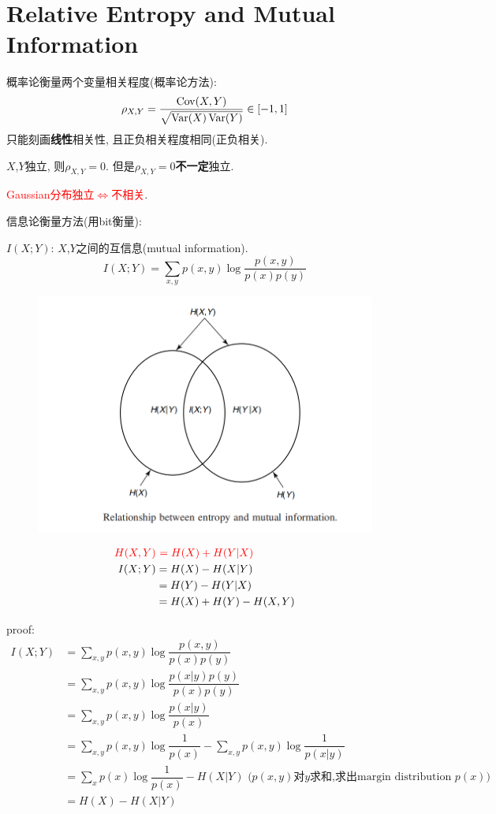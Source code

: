 \section{Relative Entropy and Mutual Information}
概率论衡量两个变量相关程度(概率论方法):
$$\rho_{X,Y}=\dfrac{\operatorname{Cov}(X,Y)}{\sqrt{\operatorname{Var}(X)\operatorname{Var}(Y)}}\in[-1,1]$$
只能刻画\textbf{线性}相关性, 且正负相关程度相同(正负相关).

\begin{proposition}
$X$,$Y$独立, 则$\rho_{X,Y}=0$. 但是$\rho_{X,Y}=0$\textbf{不一定}独立.

\textcolor{red}{Gaussian分布独立$\Leftrightarrow$不相关}.
\end{proposition}

信息论衡量方法(用bit衡量):
\begin{definition}
$I(X;Y)$: $X$,$Y$之间的互信息(mutual information).
$$I(X;Y)=\sum_{x,y}p(x,y)\log\dfrac{p(x,y)}{p(x)p(y)}$$
\end{definition}

\begin{figure}[htbp]
    \centering
    \includegraphics[width=\textwidth]{./figures/entropy_mutual_imformation.png}
\end{figure}

\begin{align*}
\textcolor{red}{H(X,Y)} &\ \textcolor{red}{= H(X) + H(Y|X)} \\
I(X;Y) &= H(X) - H(X|Y) \\
&= H(Y) - H(Y|X) \\
&= H(X) + H(Y) - H(X,Y)
\end{align*}

proof:
\begin{align*}
I(X;Y) &= \sum_{x,y}p(x,y)\log\dfrac{p(x,y)}{p(x)p(y)} \\
&= \sum_{x,y}p(x,y)\log\dfrac{p(x|y)p(y)}{p(x)p(y)} \\
&= \sum_{x,y}p(x,y)\log\dfrac{p(x|y)}{p(x)} \\
&= \sum_{x,y}p(x,y)\log\dfrac{1}{p(x)} - \sum_{x,y}p(x,y)\log\dfrac{1}{p(x|y)} \\
&= \sum_{x}p(x)\log\dfrac{1}{p(x)} - H(X|Y) \text{\ \ ($p(x,y)$对$y$求和,求出margin distribution $p(x)$)}\\
&= H(X) - H(X|Y)
\end{align*}

